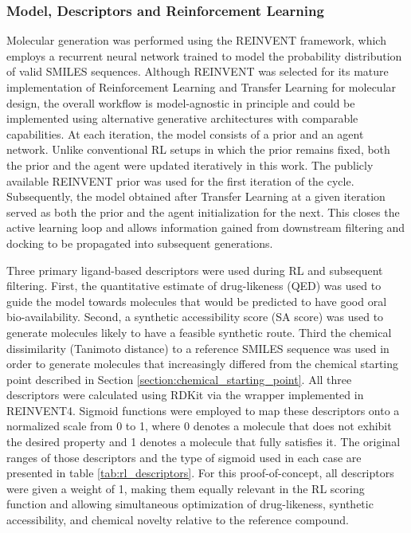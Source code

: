 \documentclass[letterpaper]{article}
\begin{document}
\subsubsection{Model, Descriptors and Reinforcement Learning}
Molecular generation was performed using the REINVENT framework, which employs a recurrent neural network trained to model the probability distribution of valid SMILES sequences\cite{Blaschke2020ReinventDesign,Loeffler2024OptimalSimulations}. Although REINVENT was selected for its mature implementation of Reinforcement Learning and Transfer Learning for molecular design, the overall workflow is model-agnostic in principle and could be implemented using alternative generative architectures with comparable capabilities. At each iteration, the model consists of a prior and an agent network. Unlike conventional RL setups in which the prior remains fixed, both the prior and the agent were updated iteratively in this work. The publicly available REINVENT prior\cite{LofflerREINVENT4Priors} was used for the first iteration of the cycle. Subsequently, the model obtained after Transfer Learning at a given iteration served as both the prior and the agent initialization for the next. This closes the active learning loop and allows information gained from downstream filtering and docking to be propagated into subsequent generations. 

Three primary ligand-based descriptors were used during RL and subsequent filtering. First, the quantitative estimate of drug-likeness (QED)\cite{Wildman1999PredictionContributions,Bickerton2012QuantifyingDrugs} was used to guide the model towards molecules that would be predicted to have good oral bio-availability. Second, a synthetic accessibility score (SA score) was used to generate molecules likely to have a feasible synthetic route\cite{Ertl2009EstimationContributions}. Third the chemical dissimilarity (Tanimoto distance) to a reference SMILES sequence was used in order to generate molecules that increasingly differed from the chemical starting point described in Section \ref{section:chemical_starting_point}. All three descriptors were calculated using RDKit\cite{RDKit:Chemoinformatics} via the wrapper implemented in REINVENT4. Sigmoid functions were employed to map these descriptors onto a normalized scale from 0 to 1, where 0 denotes a molecule that does not exhibit the desired property and 1 denotes a molecule that fully satisfies it. The original ranges of those descriptors and the type of sigmoid used in each case are presented in table \ref{tab:rl_descriptors}. For this proof-of-concept, all descriptors were given a weight of 1, making them equally relevant in the RL scoring function and allowing simultaneous optimization of drug-likeness, synthetic accessibility, and chemical novelty relative to the reference compound.
\end{document}
